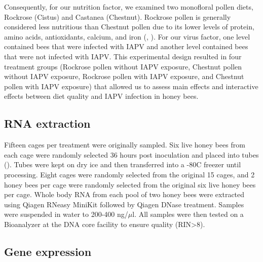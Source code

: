 \documentclass[11pt,a4paper,oldfontcommands,openany]{memoir}
\numberwithin{equation}{section} %
\begin{document}
Consequently, for our nutrition factor, we examined two monofloral pollen diets, Rockrose (Cistus) and Castanea (Chestnut). Rockrose pollen is generally considered less nutritious than Chestnut pollen due to its lower levels of protein, amino acids, antioxidants, calcium, and iron (\citealt{DiPasquale}, \citealt{adamInt}). For our virus factor, one level contained bees that were infected with IAPV and another level contained bees that were not infected with IAPV. This experimental design resulted in four treatment groups (Rockrose pollen without IAPV exposure, Chestnut pollen without IAPV exposure, Rockrose pollen with IAPV exposure, and Chestnut pollen with IAPV exposure) that allowed us to assess main effects and interactive effects between diet quality and IAPV infection in honey bees.

\subsection{RNA extraction}

Fifteen cages per treatment were originally sampled. Six live honey bees from each cage were randomly selected 36 hours post inoculation and placed into tubes (\citealt{carrillo}). Tubes were kept on dry ice and then transferred into a -80C freezer until processing. Eight cages were randomly selected from the original 15 cages, and 2 honey bees per cage were randomly selected from the original six live honey bees per cage. Whole body RNA from each pool of two honey bees were extracted using Qiagen RNeasy MiniKit followed by Qiagen DNase treatment. Samples were suspended in water to 200-400 ng/$\mu$l. All samples were then tested on a Bioanalyzer at the DNA core facility to ensure quality (RIN>8).

\subsection{Gene expression}
\end{document}
